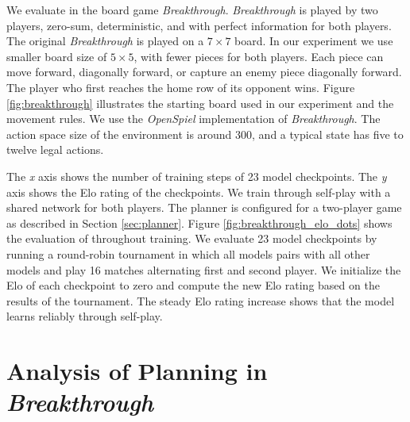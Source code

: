 
We evaluate \moozi in the board game \textit{Breakthrough}.
\textit{Breakthrough} is played by two players, zero-sum, deterministic, and with perfect information for both players.
The original \textit{Breakthrough} is played on a $7 \times 7$ board.
In our experiment we use smaller board size of \(5 \times 5\), with fewer pieces for both players.
Each piece can move forward, diagonally forward, or capture an enemy piece diagonally forward.
The player who first reaches the home row of its opponent wins.
Figure \ref{fig:breakthrough} illustrates the starting board used in our experiment and the movement rules.
We use the \textit{OpenSpiel} implementation of \textit{Breakthrough}.
The action space size of the environment is around 300, and a typical state has five to twelve legal actions.

{
    The \textit{x} axis shows the number of training steps of 23 model checkpoints.
    The \textit{y} axis shows the Elo rating of the checkpoints.
}
We train \moozi through self-play with a shared network for both players.
The planner is configured for a two-player game as described in Section \ref{sec:planner}.
Figure \ref{fig:breakthrough_elo_dots} shows the evaluation of \moozi throughout training.
We evaluate 23 model checkpoints by running a round-robin tournament in which all models pairs with all other models and play 16 matches alternating first and second player.
We initialize the Elo of each checkpoint to zero and compute the new Elo rating based on the results of the tournament.
The steady Elo rating increase shows that the model learns reliably through self-play.


\section{Analysis of Planning in \textit{Breakthrough}} \label{sec:exp:plan_breakthrough}


